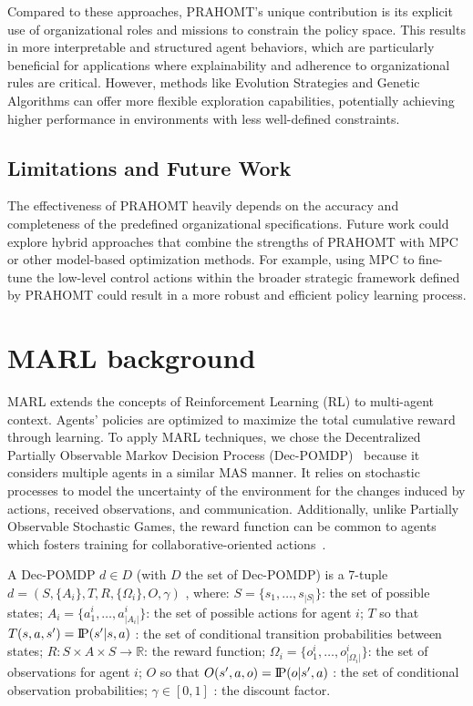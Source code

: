 \documentclass[sigconf,anonymous]{aamas}
\newcommand{\probP}{\text{I\kern-0.15em P}}
\begin{document}
Compared to these approaches, PRAHOMT's unique contribution is its explicit use of organizational roles and missions to constrain the policy space. This results in more interpretable and structured agent behaviors, which are particularly beneficial for applications where explainability and adherence to organizational rules are critical. However, methods like Evolution Strategies and Genetic Algorithms can offer more flexible exploration capabilities, potentially achieving higher performance in environments with less well-defined constraints.

\subsection{Limitations and Future Work}
The effectiveness of PRAHOMT heavily depends on the accuracy and completeness of the predefined organizational specifications. Future work could explore hybrid approaches that combine the strengths of PRAHOMT with MPC or other model-based optimization methods. For example, using MPC to fine-tune the low-level control actions within the broader strategic framework defined by PRAHOMT could result in a more robust and efficient policy learning process.




\section{MARL background}\label{sec:marl_background}

MARL extends the concepts of Reinforcement Learning (RL) to multi-agent context. Agents' policies are optimized to maximize the total cumulative reward through learning.
To apply MARL techniques, we chose the Decentralized Partially Observable Markov Decision Process (Dec-POMDP)~\cite{Oliehoek2016} because it considers multiple agents in a similar MAS manner. It relies on stochastic processes to model the uncertainty of the environment for the changes induced by actions, received observations, and communication. Additionally, unlike Partially Observable Stochastic Games, the reward function can be common to agents which fosters training for collaborative-oriented actions~\cite{Beynier2013}.

A Dec-POMDP $d \in D$ (with $D$ the set of Dec-POMDP) is a 7-tuple $d = (S,\{A_i\},T,R,\{\Omega_i\},O,\gamma)$ , where:
$S = \{s_1,\dots,s_{|S|}\}$: the set of possible states;
$A_{i} = \{a_{1}^{i},\dots,a_{|A_{i}|}^{i}\}$: the set of possible actions for agent $i$;
$T$ so that $T(s,a,s') = \probP{(s'|s,a)}$ : the set of conditional transition probabilities between states;
$R: S \times A \times S \rightarrow \mathbb{R}$: the reward function;
$\Omega_{i} = \{o_{1}^{i},\dots,o_{|\Omega_{i}|}^{i}\}$: the set of observations for agent $i$;
$O$ so that $O(s',a,o) = \probP{(o|s',a)}$ : the set of conditional observation probabilities;
$\gamma \in [0,1]$ : the discount factor.
\end{document}
